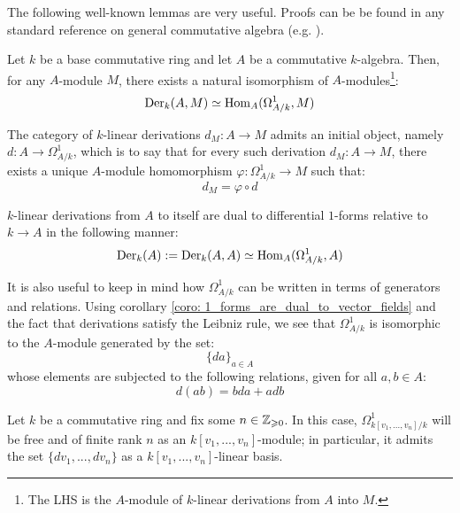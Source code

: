         The following well-known lemmas are very useful. Proofs can be be found in any standard reference on general commutative algebra (e.g. \cite[\href{https://stacks.math.columbia.edu/tag/00AO}{Tag 00AO}]{stacks}).
        \begin{lemma}
            \cite[\href{https://stacks.math.columbia.edu/tag/00RO}{Tag 00RO}]{stacks} Let $k$ be a base commutative ring and let $A$ be a commutative $k$-algebra. Then, for any $A$-module $M$, there exists a natural isomorphism of $A$-modules\footnote{The LHS is the $A$-module of $k$-linear derivations from $A$ into $M$.}:
                $$\mathrm{Der}_k(A, M) \simeq \mathrm{Hom}_A(\Omega^1_{A/k}, M)$$
        \end{lemma}
        \begin{corollary}
            The category of $k$-linear derivations $d_M: A \to M$ admits an initial object, namely $d: A \to \Omega^1_{A/k}$, which is to say that for every such derivation $d_M: A \to M$, there exists a unique $A$-module homomorphism $\varphi: \Omega^1_{A/k} \to M$ such that:
                $$d_M = \varphi \circ d$$
        \end{corollary}
        \begin{corollary} \label{coro: 1_forms_are_dual_to_vector_fields}
            $k$-linear derivations from $A$ to itself are dual to differential $1$-forms relative to $k \to A$ in the following manner:
                $$\mathrm{Der}_k(A) := \mathrm{Der}_k(A, A) \simeq \mathrm{Hom}_A(\Omega^1_{A/k}, A)$$
        \end{corollary}
        \begin{remark}
            It is also useful to keep in mind how $\Omega^1_{A/k}$ can be written in terms of generators and relations. Using corollary \ref{coro: 1_forms_are_dual_to_vector_fields} and the fact that derivations satisfy the Leibniz rule, we see that $\Omega^1_{A/k}$ is isomorphic to the $A$-module generated by the set:
                $$\{da\}_{a \in A}$$
            whose elements are subjected to the following relations, given for all $a, b \in A$:
                $$d(ab) = b da + a db$$
        \end{remark}
        \begin{lemma} \label{lemma: 1_forms_over_polynomial_algebras}
            \cite[\href{https://stacks.math.columbia.edu/tag/00RX}{Tag 00RX}]{stacks} Let $k$ be a commutative ring and fix some $n \in \mathbb{Z}_{\geqslant 0}$. In this case, $\Omega^1_{k[v_1, ..., v_n]/k}$ will be free and of finite rank $n$ as an $k[v_1, ..., v_n]$-module; in particular, it admits the set $\{dv_1, ..., dv_n\}$ as a $k[v_1, ..., v_n]$-linear basis.
        \end{lemma}

